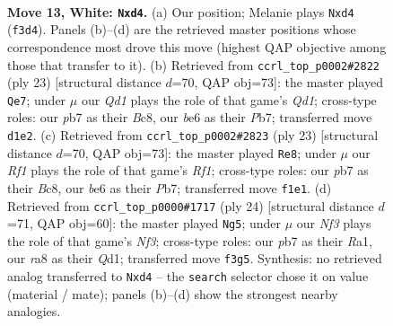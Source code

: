 \documentclass[11pt]{article}
\begin{document}
\clearpage

\begin{figure}[p]\centering
\begin{subfigure}{0.46\textwidth}\centering
\resizebox{\linewidth}{!}{%
\newchessgame
\chessboard[
  setfen={rn2r1k1/pp3ppp/3bbq2/3p4/3p4/N2B1N2/PPP2PPP/R2Q1RK1 w - - 2 13},
  showmover=false,
  pgfstyle=straightmove, color=movearrow, markmove={f3-d4}
]}
\caption{}
\end{subfigure}\hfill
\begin{subfigure}{0.46\textwidth}\centering
\resizebox{\linewidth}{!}{%
\newchessgame
\chessboard[
  setfen={r1bq1rk1/pp3ppp/2pb1n2/2n5/3NP3/6P1/PPQ2PBP/RNBR2K1 b - - 2 12},
  showmover=false,
  pgfstyle=straightmove, color=movearrow, markmove={d8-e7}
]}
\caption{}
\end{subfigure}
\\[4pt]
\begin{subfigure}{0.46\textwidth}\centering
\resizebox{\linewidth}{!}{%
\newchessgame
\chessboard[
  setfen={r1bq1rk1/pp3ppp/2pb1n2/2n5/3NP3/6P1/PPQ2PBP/RNBR2K1 b - - 2 12},
  showmover=false,
  pgfstyle=straightmove, color=movearrow, markmove={f8-e8}
]}
\caption{}
\end{subfigure}\hfill
\begin{subfigure}{0.46\textwidth}\centering
\resizebox{\linewidth}{!}{%
\newchessgame
\chessboard[
  setfen={rn1qkb1r/1b3ppp/p3p3/4P3/Pp1p4/1B3N2/1P1B1PPP/R2Q1RK1 w kq - 0 13},
  showmover=false,
  pgfstyle=straightmove, color=movearrow, markmove={f3-g5}
]}
\caption{}
\end{subfigure}
\caption{\textbf{Move 13, White: \texttt{Nxd4}.} (a) Our position; Melanie plays \texttt{Nxd4} (\texttt{f3d4}). Panels (b)--(d) are the retrieved master positions whose correspondence most drove this move (highest QAP objective among those that transfer to it). (b) Retrieved from \texttt{ccrl\_top\_p0002\#2822} (ply 23) [structural distance $d$=70, QAP obj=73]: the master played \texttt{Qe7}; under $\mu$ our \emph{Qd1} plays the role of that game's \emph{Qd1}; cross-type roles: our \emph{p}b7 as their \emph{B}c8, our \emph{b}e6 as their \emph{P}b7; transferred move \texttt{d1e2}. (c) Retrieved from \texttt{ccrl\_top\_p0002\#2823} (ply 23) [structural distance $d$=70, QAP obj=73]: the master played \texttt{Re8}; under $\mu$ our \emph{Rf1} plays the role of that game's \emph{Rf1}; cross-type roles: our \emph{p}b7 as their \emph{B}c8, our \emph{b}e6 as their \emph{P}b7; transferred move \texttt{f1e1}. (d) Retrieved from \texttt{ccrl\_top\_p0000\#1717} (ply 24) [structural distance $d$=71, QAP obj=60]: the master played \texttt{Ng5}; under $\mu$ our \emph{Nf3} plays the role of that game's \emph{Nf3}; cross-type roles: our \emph{p}b7 as their \emph{R}a1, our \emph{r}a8 as their \emph{Q}d1; transferred move \texttt{f3g5}. Synthesis: no retrieved analog transferred to \texttt{Nxd4} -- the \texttt{search} selector chose it on value (material / mate); panels (b)--(d) show the strongest nearby analogies.}
\label{fig:thought-m24}
\end{figure}
\end{document}
